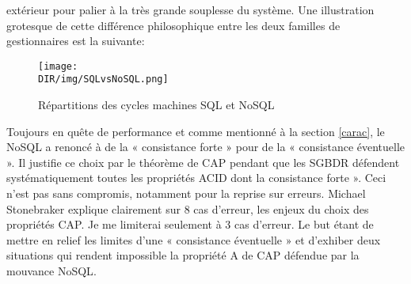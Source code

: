 extérieur pour palier à la très grande souplesse du système.  Une
illustration grotesque de cette différence philosophique entre les
deux familles de gestionnaires est la suivante:
\begin {figure}[H]
       \centering
        \texttt{[image: \\DIR/img/SQLvsNoSQL.png]}	
        \caption{Répartitions des cycles machines \textsf{SQL} et \textsf{NoSQL}}
	\label{sqlvsnoql}
  \end {figure}    
\noindent
Toujours en quête de performance et comme mentionné à la section \ref{carac}, 
le \textsf{NoSQL} a renoncé à de la « \textsf{consistance forte} » pour de la « \textsf{consistance éventuelle} ». Il justifie ce choix par le théorème de \textsf{CAP} pendant que les \textsf{SGBDR} défendent systématiquement toutes les propriétés \textsf{ACID} dont la \textsf{consistance forte} ». Ceci n'est pas sans compromis, notamment 
pour la reprise sur erreurs. 
\textsf{Michael Stonebraker} explique clairement sur 8 cas d'erreur,  
les enjeux du choix
des propriétés \textsf{CAP}\cite{MichaelStonebraker2}. Je me limiterai seulement à
3 cas d'erreur. Le but étant de mettre en relief les limites d'une « \textsf{consistance éventuelle} »
et d'exhiber deux situations qui rendent impossible la propriété \textsf{A} de \textsf{CAP} défendue par la mouvance \textsf{NoSQL}.
\def\exempleA{We assume a typical hardware model of a
collection of local processing and storage nodes assembled into a cluster using LAN networking.
The clusters, in turn, are wired together using WAN networking.
Let’s start with a discussion of what causes errors in databases:}

\def\exemple{Dans l'illustration qu'il a utilisé, \textsf{Michael Stonebraker} a considéré un ensemble de clusters interconnectés via un réseau \textsf{WAN}. 
Les nœuds à l'intérieur d'un cluster utilisent le \textsf{LAN} pour échanger. Ci-dessous trois cas d'erreur possibles:}

\def\casaA{Application errors. The application performed one or more incorrect updates. Generally, this is
not discovered for minutes to hours thereafter. The database must be
backed up to a point before the offending transaction(s), and
subsequent activity redone.}

\def\casa{Erreur au niveau de la couche application. Une application effectue une ou plusieurs mises à jour incorrectes. De telles erreurs ne sont généralement pas détectées dans les minutes qui suivent afin de revenir sur une version précédente de la base avant les mises à jour incorrectes.}

